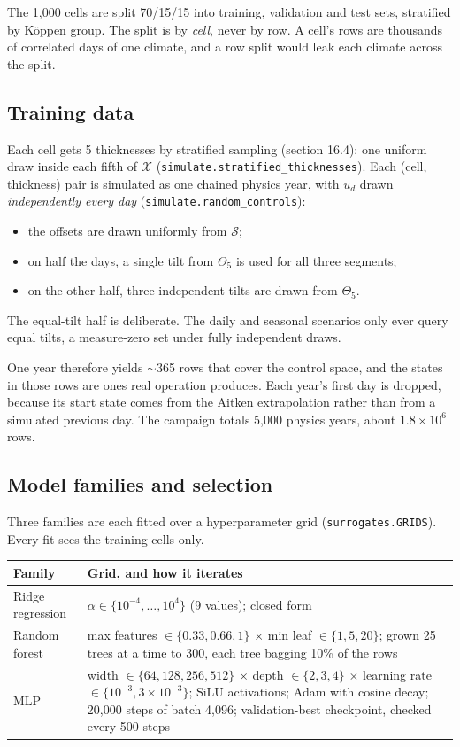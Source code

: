 \documentclass[11pt]{article}
\newcommand{\code}[1]{\texttt{#1}}
\begin{document}
The 1,000 cells are split 70/15/15 into training, validation and test sets, stratified by
K\"oppen group. The split is by \emph{cell}, never by row. A cell's rows are thousands of
correlated days of one climate, and a row split would leak each climate across the split.

\subsection{Training data}

Each cell gets 5 thicknesses by stratified sampling (section 16.4): one uniform draw inside
each fifth of $\mathcal{X}$ (\code{simulate.stratified\_thicknesses}). Each (cell, thickness)
pair is simulated as one chained physics year, with $u_d$ drawn \emph{independently every
day} (\code{simulate.random\_controls}):
\begin{itemize}
\item the offsets are drawn uniformly from $\mathcal{S}$;
\item on half the days, a single tilt from $\Theta_5$ is used for all three segments;
\item on the other half, three independent tilts are drawn from $\Theta_5$.
\end{itemize}
The equal-tilt half is deliberate. The daily and seasonal scenarios only ever query equal
tilts, a measure-zero set under fully independent draws.

One year therefore yields $\sim$365 rows that cover the control space, and the states in
those rows are ones real operation produces. Each year's first day is dropped, because its
start state comes from the Aitken extrapolation rather than from a simulated previous day.
The campaign totals 5,000 physics years, about $1.8\times10^6$ rows.

\subsection{Model families and selection}

Three families are each fitted over a hyperparameter grid (\code{surrogates.GRIDS}). Every fit
sees the training cells only.

\begin{table}[h]
\centering
\small
\begin{tabular}{@{}lp{}@{}}
\toprule
\textbf{Family} & \textbf{Grid, and how it iterates} \\
\midrule
Ridge regression & $\alpha \in \{10^{-4}, \dots, 10^4\}$ (9 values); closed form \\
Random forest & max features $\in \{0.33, 0.66, 1\}$ $\times$ min leaf $\in \{1, 5, 20\}$;
grown 25 trees at a time to 300, each tree bagging 10\% of the rows \\
MLP & width $\in \{64, 128, 256, 512\}$ $\times$ depth $\in \{2, 3, 4\}$ $\times$
learning rate $\in \{10^{-3}, 3\times10^{-3}\}$; SiLU activations; Adam with cosine decay;
20,000 steps of batch 4,096; validation-best checkpoint, checked every 500 steps \\
\bottomrule
\end{tabular}
\end{table}
\end{document}
